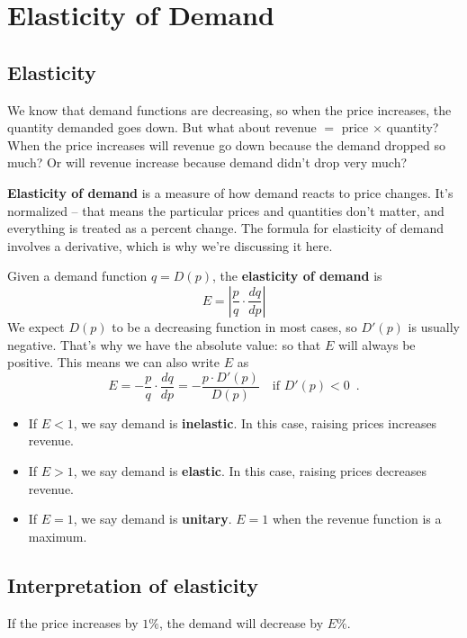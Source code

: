 \section{Elasticity of Demand}
\label{sec:demand}

\subsection{Elasticity}
We know that demand functions are decreasing, so when the price increases, the quantity demanded goes down. But what about revenue $=$ price $\times$ quantity? When the price increases will revenue go down because the demand dropped so much? Or will revenue increase because demand didn't drop very much?

{\bf Elasticity of demand} is a measure of how demand reacts to price changes. It’s normalized -- that means the particular prices and quantities don't matter, and everything is treated as a percent change. The formula for elasticity of demand involves a derivative, which is why we’re discussing it here.

\begin{definition}
Given a demand function $q=D(p)$, the {\bf elasticity of demand} is
$$E=\left|\frac{p}{q}\cdot \frac{dq}{dp}\right|$$
We expect $D(p)$ to be a decreasing function in most cases, so $D'(p)$ is usually negative. That's why we have the absolute value: so that $E$ will always be positive. This means we can also write $E$ as 
$$E = -\dfrac{p}{q}\cdot\dfrac{dq}{dp} = -\dfrac{p \cdot D'(p)}{D(p)} \quad \text{if } D'(p)<0 \enspace .$$ 
\begin{itemize}
    \item If $E<1$, we say demand is {\bf inelastic}. In this case, raising prices increases revenue.
    \item If $E>1$, we say demand is {\bf elastic}. In this case, raising prices decreases revenue.
    \item If $E=1$, we say demand is {\bf unitary}. $E=1$ when the revenue function is a maximum.
\end{itemize}
\end{definition}

\subsection{Interpretation of elasticity}
If the price increases by $1\%$, the demand will decrease by $E\%$.

